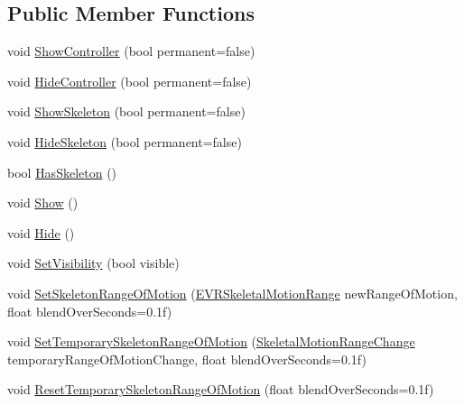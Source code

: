 \subsection*{Public Member Functions}
\begin{DoxyCompactItemize}
\item 
void \mbox{\hyperlink{class_valve_1_1_v_r_1_1_interaction_system_1_1_hand_a66068d2f4971c3bb2889d95e63745e87}{Show\+Controller}} (bool permanent=false)
\item 
void \mbox{\hyperlink{class_valve_1_1_v_r_1_1_interaction_system_1_1_hand_a3eaf975b231ccd8bec17ef88bd20f0f1}{Hide\+Controller}} (bool permanent=false)
\item 
void \mbox{\hyperlink{class_valve_1_1_v_r_1_1_interaction_system_1_1_hand_aadca63a28b7a68eba58631525b8e1296}{Show\+Skeleton}} (bool permanent=false)
\item 
void \mbox{\hyperlink{class_valve_1_1_v_r_1_1_interaction_system_1_1_hand_afbf22ceb410ba6e8e4056efb96c98bab}{Hide\+Skeleton}} (bool permanent=false)
\item 
bool \mbox{\hyperlink{class_valve_1_1_v_r_1_1_interaction_system_1_1_hand_ab31b480ec46183481868a463391c633f}{Has\+Skeleton}} ()
\item 
void \mbox{\hyperlink{class_valve_1_1_v_r_1_1_interaction_system_1_1_hand_af3c098e17efc4697374e3ec76d80b45c}{Show}} ()
\item 
void \mbox{\hyperlink{class_valve_1_1_v_r_1_1_interaction_system_1_1_hand_a9f1dbbb6c195ffc69d14396ab5f6296a}{Hide}} ()
\item 
void \mbox{\hyperlink{class_valve_1_1_v_r_1_1_interaction_system_1_1_hand_aa0c76c11d150d1aa4e0dca00303fe07e}{Set\+Visibility}} (bool visible)
\item 
void \mbox{\hyperlink{class_valve_1_1_v_r_1_1_interaction_system_1_1_hand_abc70f48307d26582cca196676e282d2a}{Set\+Skeleton\+Range\+Of\+Motion}} (\mbox{\hyperlink{namespace_valve_1_1_v_r_affc8d18345f8f5d36f1ae7b4ce534500}{E\+V\+R\+Skeletal\+Motion\+Range}} new\+Range\+Of\+Motion, float blend\+Over\+Seconds=0.\+1f)
\item 
void \mbox{\hyperlink{class_valve_1_1_v_r_1_1_interaction_system_1_1_hand_accf176fb5b39fbadddbddf7792a5f440}{Set\+Temporary\+Skeleton\+Range\+Of\+Motion}} (\mbox{\hyperlink{namespace_valve_1_1_v_r_aabb506007a41244de5c315ff5519439f}{Skeletal\+Motion\+Range\+Change}} temporary\+Range\+Of\+Motion\+Change, float blend\+Over\+Seconds=0.\+1f)
\item 
void \mbox{\hyperlink{class_valve_1_1_v_r_1_1_interaction_system_1_1_hand_a30924ebdc6a8c20f9109aaf38c7cfe46}{Reset\+Temporary\+Skeleton\+Range\+Of\+Motion}} (float blend\+Over\+Seconds=0.\+1f)

\end{DoxyCompactItemize}
